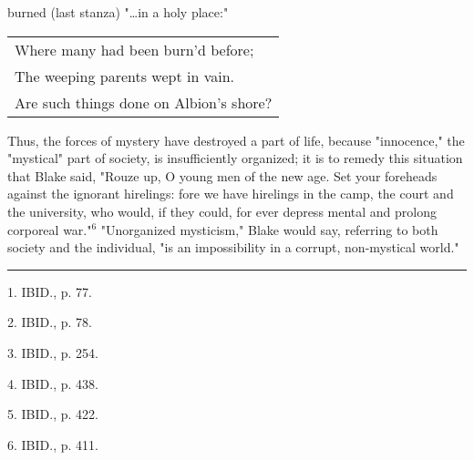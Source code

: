 burned (last stanza) "\dots in a holy place:"\par
\begin{center}
	\begin{tabular}{l}
		Where many had been burn'd before; \\
		The weeping parents wept in vain.  \\
		Are such things done on Albion's shore?
	\end{tabular}
\end{center}
\hspace*{5mm}Thus, the forces of mystery have destroyed a part of life, because "innocence," the "mystical" part of society,
is insufficiently organized; it is to remedy this situation that Blake said, "Rouze up, O young men of the new age. Set your foreheads against the ignorant hirelings: fore we have
hirelings in the camp, the court and the university, who would, if they could, for ever depress mental and prolong corporeal war."$^{6}$
"Unorganized mysticism," Blake would say, referring to both society and the individual, "is an impossibility in a corrupt, non-mystical world."\par
\vspace*{\fill}
\noindent\rule{0.25\textwidth}{0.4pt}\par
1. IBID., p. 77.\par
2. IBID., p. 78.\par
3. IBID., p. 254.\par
4. IBID., p. 438.\par
5. IBID., p. 422.\par
6. IBID., p. 411.\par

\newpage

